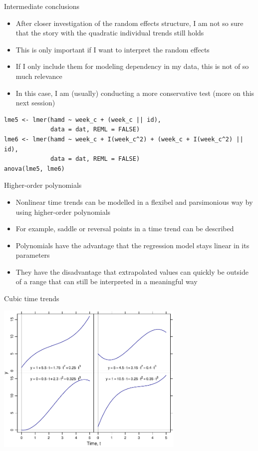 \documentclass[aspectratio=169]{beamer}
\begin{document}
\begin{frame}[fragile]{Intermediate conclusions}
  \begin{itemize}
    \item After closer investigation of the random effects structure, I am not
      so sure that the story with the quadratic individual trends still holds
    \item This is only important if I want to interpret the random effects
    \item If I only include them for modeling dependency in my data, this is
      not of so much relevance
    \item In this case, I am (usually) conducting a more conservative test (more
      on this next session)
  \end{itemize}
\begin{lstlisting}
lme5 <- lmer(hamd ~ week_c + (week_c || id),
             data = dat, REML = FALSE)
lme6 <- lmer(hamd ~ week_c + I(week_c^2) + (week_c + I(week_c^2) || id),
             data = dat, REML = FALSE)
anova(lme5, lme6)
\end{lstlisting}
\end{frame}

\begin{frame}{Higher-order polynomials}
  \begin{itemize}
    \item Nonlinear time trends can be modelled in a flexibel and parsimonious
      way by using higher-order polynomials
    \item For example, saddle or reversal points in a time trend can be
      described
    \item Polynomials have the advantage that the regression model stays linear
      in its parameters
    \item They have the disadvantage that extrapolated values can quickly be
      outside of a range that can still be interpreted in a meaningful way
  \end{itemize}
\end{frame}


\begin{frame}{Cubic time trends}
\begin{center}
\includegraphics[width=9cm]{../figures/cubic}
\end{center}
\end{frame}
\end{document}
